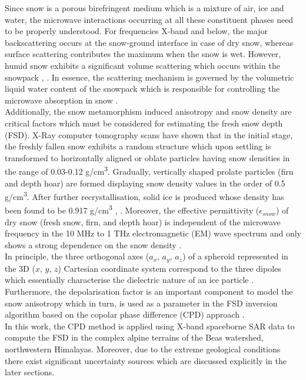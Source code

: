 \documentclass{article}
\begin{document}
Since snow is a porous birefringent medium which is a mixture of air, ice and water, the microwave interactions occurring at all these constituent phases need to be properly understood. For frequencies X-band and below, the major backscattering occurs at the snow-ground interface in case of dry snow, whereas surface scattering contributes the maximum when the snow is wet. However, humid snow exhibits a significant volume scattering which occurs within the snowpack \cite{Thakur2012}, \cite{Leinss2014}. In essence, the scattering mechanism is governed by the volumetric liquid water content of the snowpack which is responsible for controlling the microwave absorption in snow \cite{Leinss2014}.\\
\indent Additionally, the snow metamorphism induced anisotropy and snow density are critical factors which must be considered for estimating the fresh snow depth (FSD). X-Ray computer tomography scans have shown that in the initial stage, the freshly fallen snow exhibits a random structure which upon settling is transformed to horizontally aligned or oblate particles having snow densities in the range of 0.03-0.12 g/cm\textsuperscript{3}. Gradually, vertically shaped prolate particles (firn and depth hoar) are formed displaying snow density values in the order of 0.5 g/cm\textsuperscript{3}. After further recrystallisation, solid ice is produced whose density has been found to be 0.917 g/cm\textsuperscript{3} \cite{Leinss2014}, \cite{Riche2013}. Moreover, the effective permittivity ($\epsilon_{snow}$) of dry snow (fresh snow, firn, and depth hoar) is independent of the microwave frequency in the 10 MHz to 1 THz electromagnetic (EM) wave spectrum and only shows a strong dependence on the snow density \cite{Leinss2014}.\\
\indent In principle, the three orthogonal axes ($a_x$, $a_y$, $a_z$) of a spheroid represented in the 3D ($x$, $y$, $z$) Cartesian coordinate system correspond to the three dipoles which essentially characterise the dielectric nature of an ice particle \cite[Fig. 6]{Leinss2014}. Furthermore, the depolarisation factor is an important component to model the snow anisotropy which in turn, is used as a parameter in the FSD inversion algorithm based on the copolar phase difference (CPD) approach \cite{Leinss2014}.\\
\indent In this work, the CPD method is applied using X-band spaceborne SAR data to compute the FSD in the complex alpine terrains of the Beas watershed, northwestern Himalayas. Moreover, due to the extreme geological conditions there exist significant uncertainty sources which are discussed explicitly in the later sections.
\end{document}

